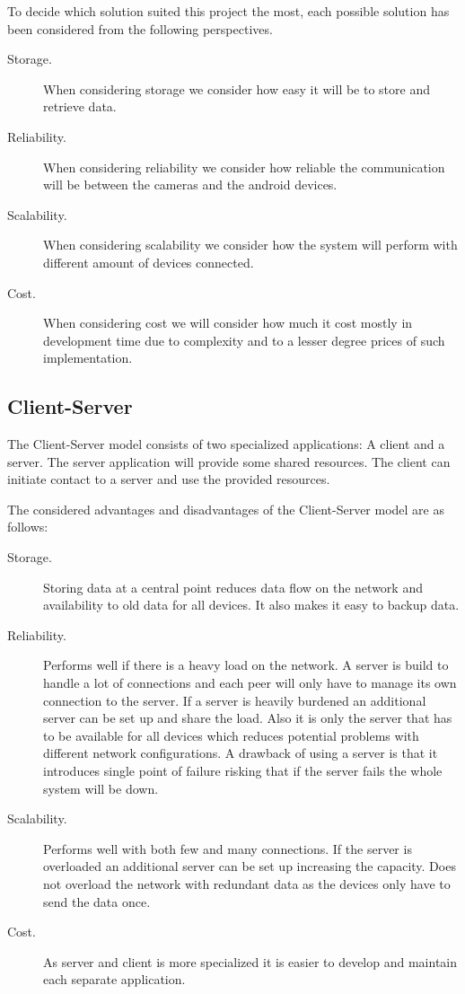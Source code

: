 To decide which solution suited this project the most, each possible solution has been considered from the following perspectives.

\begin{description}
\item[Storage.] When considering storage we consider how easy it will be to store and retrieve data.
\item[Reliability.] When considering reliability we consider how reliable the communication will be between the cameras and the android devices.
\item[Scalability.] When considering scalability we consider how the system will perform with different amount of devices connected.
\item[Cost.] When considering cost we will consider how much it cost mostly in development time due to complexity and to a lesser degree prices of such implementation.
\end{description}

\subsection{Client-Server}
The Client-Server model consists of two specialized applications: A client and a server. The server application will provide some shared resources. The client can initiate contact to a server and use the provided resources.

The considered advantages and disadvantages of the Client-Server model are as follows:

\begin{description}
\item[Storage.] Storing data at a central point reduces data flow on the network and availability to old data for all devices. It also makes it easy to backup data.

\item[Reliability.] Performs well if there is a heavy load on the network. A server is build to handle a lot of connections and each peer will only have to manage its own connection to the server. If a server is heavily burdened an additional server can be set up and share the load. Also it is only the server that has to be available for all devices which reduces potential problems with different network configurations. A drawback of using a server is that it introduces single point of failure risking that if the server fails the whole system will be down.

\item[Scalability.] Performs well with both few and many connections. If the server is overloaded an additional server can be set up increasing the capacity. Does not overload the network with redundant data as the devices only have to send the data once.

\item[Cost.] As server and client is more specialized it is easier to develop and maintain each separate application. 
\end{description}

